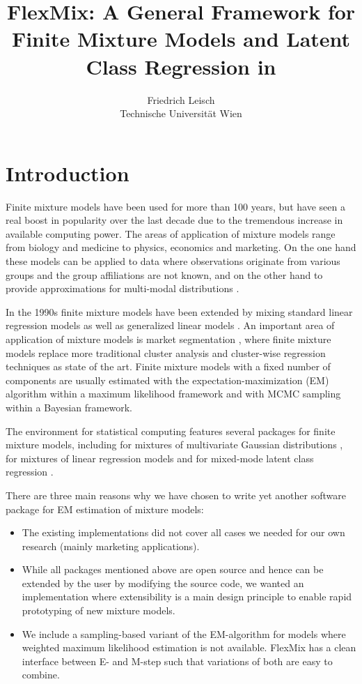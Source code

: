 \documentclass{jss}
\title{FlexMix: A General Framework for Finite Mixture
  Models and Latent Class Regression in \proglang{R}}
\author{Friedrich Leisch\\Technische Universit{\"a}t Wien}
\newcommand{\R}{\proglang{R}}
\begin{document}
\section{Introduction}
\label{sec:introduction}

Finite mixture models have been used for more than 100 years, but have
seen a real boost in popularity over the last decade due to the
tremendous increase in available computing power. The areas of
application of mixture models range from biology and medicine to
physics, economics and marketing.  On the one hand these models can be
applied to data where observations originate from various groups and
the group affiliations are not known, and on the other hand to provide
approximations for multi-modal distributions
\citep{flb:Everitt+Hand:1981,flb:Titterington+Smith+Makov:1985,flb:McLachlan+Peel:2000}.

In the 1990s finite mixture models have been extended by mixing
standard linear regression models as well as generalized linear models
\citep{flm:Wedel+DeSarbo:1995}. An important area of application of
mixture models is market segmentation \citep{flb:Wedel+Kamakura:2001},
where finite mixture models replace more traditional cluster analysis
and cluster-wise regression techniques as state of the art.  Finite
mixture models with a fixed number of components are usually estimated
with the expectation-maximization (EM) algorithm within a maximum
likelihood framework \citep{flm:Dempster+Laird+Rubin:1977} and with
MCMC sampling \citep{flm:Diebolt+Robert:1994} within a Bayesian
framework.

The \R{} environment for statistical computing \citep{flm:r-core:2004}
features several packages for finite mixture models, including
 for mixtures of multivariate Gaussian distributions
\citep{fla:Fraley+Raftery:2002,fla:Fraley+Raftery:2002a}, 
for mixtures of linear regression models \citep{flm:Hennig:2000} and
 for mixed-mode latent class regression
\citep{flm:Buyske:2003}.

There are three main reasons why we have chosen to write yet another
software package for EM estimation of mixture models:
\begin{itemize}
 \item The existing implementations did not cover all cases we needed
  for our own research (mainly marketing applications).
 \item While all \R{} packages mentioned above are open source and hence
  can be extended by the user by modifying the source code, we wanted
  an implementation where extensibility is a main design principle to
  enable rapid prototyping of new mixture models.
 \item We include a sampling-based variant of the EM-algorithm for
  models where weighted maximum likelihood estimation is not
  available. FlexMix has a clean interface between E- and M-step such
  that variations of both are easy to combine.
\end{itemize}
\end{document}
